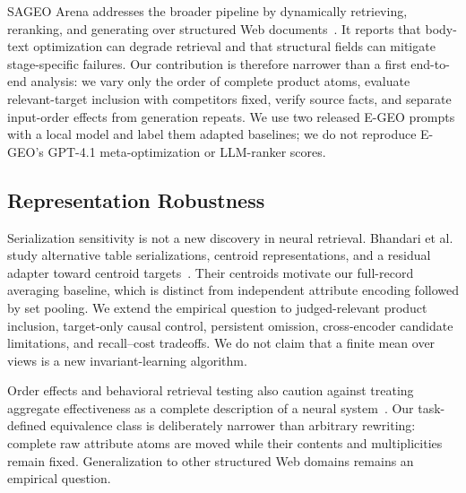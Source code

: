 SAGEO Arena addresses the broader pipeline by dynamically retrieving, reranking, and generating over structured Web documents~\cite{kim2026sageo}. It reports that body-text optimization can degrade retrieval and that structural fields can mitigate stage-specific failures. Our contribution is therefore narrower than a first end-to-end analysis: we vary only the order of complete product atoms, evaluate relevant-target inclusion with competitors fixed, verify source facts, and separate input-order effects from generation repeats. We use two released E-GEO prompts with a local model and label them adapted baselines; we do not reproduce E-GEO's GPT-4.1 meta-optimization or LLM-ranker scores.

\subsection{Representation Robustness}
Serialization sensitivity is not a new discovery in neural retrieval. Bhandari et al. study alternative table serializations, centroid representations, and a residual adapter toward centroid targets~\cite{bhandari2026tabular}. Their centroids motivate our full-record averaging baseline, which is distinct from independent attribute encoding followed by set pooling. We extend the empirical question to judged-relevant product inclusion, target-only causal control, persistent omission, cross-encoder candidate limitations, and recall--cost tradeoffs. We do not claim that a finite mean over views is a new invariant-learning algorithm.

Order effects and behavioral retrieval testing also caution against treating aggregate effectiveness as a complete description of a neural system~\cite{abdou2022wordorder,macavaney2022abnirml}. Our task-defined equivalence class is deliberately narrower than arbitrary rewriting: complete raw attribute atoms are moved while their contents and multiplicities remain fixed. Generalization to other structured Web domains remains an empirical question.
